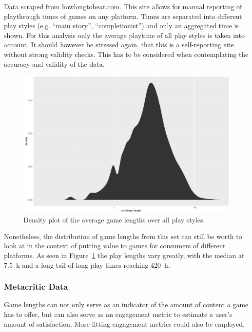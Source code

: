 Data scraped from \url{howlongtobeat.com}. This site allows for manual reporting of playthrough times of games on any platform. Times are separated into different play styles (e.g. ``main story'', ``completionist'') and only an aggregated time is shown. For this analysis only the average playtime of all play styles is taken into account.
It should however be stressed again, that this is a self-reporting site without strong validity checks. This has to be considered when contemplating the accuracy and validity of the data.

\begin{figure}[!t]
	\centering
	\includegraphics[width=1.0\columnwidth]{images/gamelengths-density.pdf}
	\caption{Density plot of the average game lengths over all play styles.}
\label{fig:gamelengths-density}
\end{figure}

Nonetheless, the distribution of game lengths from this set can still be worth to look at in the context of putting value to games for consumers of different platforms. As seen in Figure~\ref{fig:gamelengths-density} the play lengths vary greatly, with the median at \SI{7.5}{\hour} and a long tail of long play times reaching \SI{420}{\hour}.


\subsubsection{Metacritic Data}

Game lengths can not only serve as an indicator of the amount of content a game has to offer, but can also serve as an engagement metric to estimate a user's amount of satisfaction. More fitting engagement metrics could also be employed.

